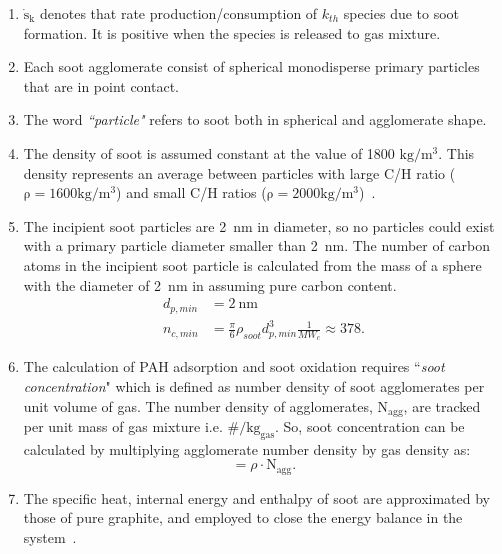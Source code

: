 \begin{enumerate}
\item $\mathrm{\dot{s}_k}$ denotes that rate production/consumption of $k_{th}$ species due to soot formation. It is positive when the species is released to gas mixture.

\item Each soot agglomerate consist of spherical monodisperse primary particles that are in point contact.

\item The word \textit{``particle"} refers to soot both in spherical and agglomerate shape. 

\item The density of soot is assumed constant at the value of 1800 $\mathrm{kg/m^3}$. This density represents an average between particles with large C/H ratio ($\mathrm{\rho=1600 kg/m^3}$) and small C/H ratios ($\mathrm{\rho=2000 kg/m^3}$)~\citep{jensen2007measurement}.

\item The incipient soot particles are 2~nm in diameter, so no particles could exist with a primary particle diameter smaller than 2~nm. The number of carbon atoms in the incipient soot particle is calculated from the mass of a sphere with the diameter of 2~nm in assuming pure carbon content.
\begin{equation}
	\begin{split}
	d_{p,min}&=2~\mathrm{nm} \\
	n_{c,min}& =\frac{\pi}{6}\rho_{soot}d^3_{p,min}\frac{1}{MW_c}\approx378
	\label{eqn:dp_min}.
	\end{split}
\end{equation}
\item The calculation of PAH adsorption and soot oxidation requires ``\textit{soot concentration}" which is defined as number density of soot agglomerates per unit volume of gas. The number density of agglomerates,  $\mathrm{N_{agg}}$, are tracked per unit mass of gas mixture i.e. $\mathrm{\#/kg_{gas}}$. So, soot concentration can be calculated by multiplying agglomerate number density by gas density as:
\begin{equation}
	[\mathrm{soot}] = \rho\cdot \mathrm{N_{agg}}
	\label{eqn:sootconcen}.
\end{equation}

\item The specific heat, internal energy and enthalpy of soot are approximated by those of pure graphite, and employed to close the energy balance in the system~\cite{mcbride1993coefficients}.


\end{enumerate}
